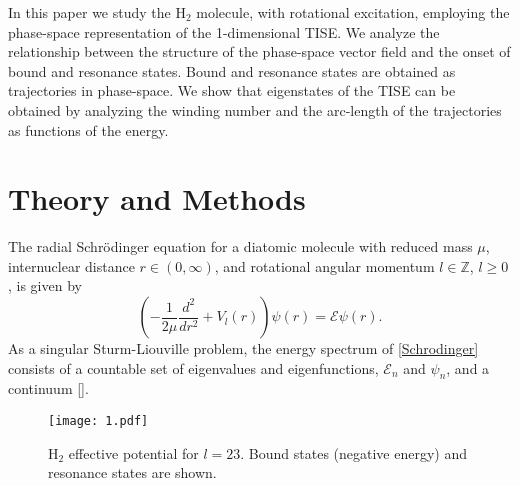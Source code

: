 \documentclass[%
 aip,
 numerical,
 jcp,
 floatfix,
rsi,%
amsmath,amssymb,
reprint,%
author-year%
]{revtex4-1}
\begin{document}
In this paper we study the  H$_2$ molecule, with rotational excitation, employing the phase-space representation of the 1-dimensional TISE. We analyze the relationship between the structure of the phase-space vector field and the onset of bound and resonance states. Bound and resonance states are obtained as trajectories in phase-space. We show that eigenstates of the TISE can be obtained by analyzing the winding number and the arc-length of the trajectories as functions of the energy. 

\section{Theory and Methods}
The radial Schr\"odinger equation for a diatomic molecule with reduced mass $\mu$, internuclear distance $r\in(0,\infty)$, and rotational angular momentum $l\in\mathbb{Z}$, $l\ge0$, is given by 
\begin{equation}\label{Schrodinger}
    \left(-\frac{1}{2\mu}\frac{d^2}{dr^2}+V_l(r)\right)\psi(r)=\mathcal{E}\psi(r).
\end{equation}
As a singular Sturm-Liouville problem, the energy spectrum of \eqref{Schrodinger} consists of a countable set of eigenvalues and eigenfunctions, $\mathcal{E}_n$ and $\psi_n$, and a continuum [].

\begin{figure}[h!]\centering
	\texttt{[image: 1.pdf]}
	\caption{H$_{2}$ effective potential for $l=23$. Bound states (negative energy) and resonance states are shown.}\label{graphics_effective_potential}
\end{figure}
\end{document}
